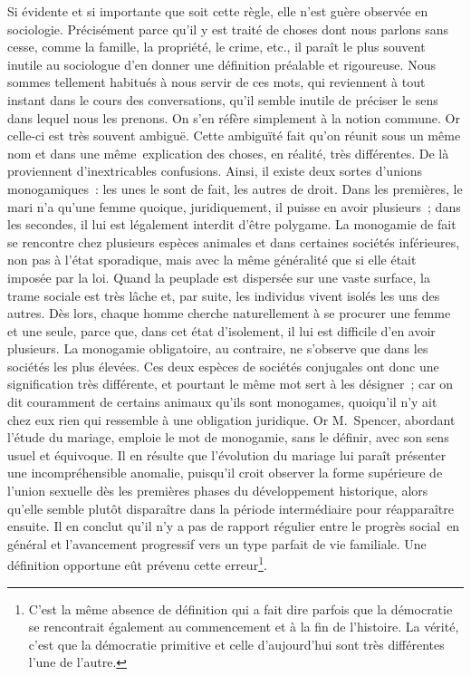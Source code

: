 \documentclass[french,twoside]{book} %
\begin{document}
Si évidente et si importante que soit cette règle, elle n’est guère observée en sociologie. Précisément parce qu’il y est traité de choses dont nous parlons sans cesse, comme la famille, la propriété, le crime, etc., il paraît le plus souvent inutile au sociologue d’en donner une définition préalable et rigoureuse. Nous sommes tellement habitués à nous servir de ces mots, qui reviennent à tout instant dans le cours des conversations, qu’il semble inutile de préciser le sens dans lequel nous les prenons. On s’en réfère simplement à la notion commune. Or celle-ci est très souvent ambiguë. Cette ambiguïté fait qu’on réunit sous un même nom et dans une même explication des choses, en réalité, très différentes. De là proviennent d’inextricables confusions. Ainsi, il existe deux sortes d’unions monogamiques : les unes le sont de fait, les autres de droit. Dans les premières, le mari n’a qu’une femme quoique, juridiquement, il puisse en avoir plusieurs ; dans les secondes, il lui est légalement interdit d’être polygame. La monogamie de fait se rencontre chez plusieurs espèces animales et dans certaines sociétés inférieures, non pas à l’état sporadique, mais avec la même généralité que si elle était imposée par la loi. Quand la peuplade est dispersée sur une vaste surface, la trame sociale est très lâche et, par suite, les individus vivent isolés les uns des autres. Dès lors, chaque homme cherche naturellement à se procurer une femme et une seule, parce que, dans cet état d’isolement, il lui est difficile d’en avoir plusieurs. La monogamie obligatoire, au contraire, ne s’observe que dans les sociétés les plus élevées. Ces deux espèces de sociétés conjugales ont donc une signification très différente, et pourtant le même mot sert à les désigner ; car on dit couramment de certains animaux qu’ils sont monogames, quoiqu’il n’y ait chez eux rien qui ressemble à une obligation juridique. Or M. Spencer, abordant l’étude du mariage, emploie le mot de monogamie, sans le définir, avec son sens usuel et équivoque. Il en résulte que l’évolution du mariage lui paraît présenter une incompréhensible anomalie, puisqu’il croit observer la forme supérieure de l’union sexuelle dès les premières phases du développement historique, alors qu’elle semble plutôt disparaître dans la période intermédiaire pour réapparaître ensuite. Il en conclut qu’il n’y a pas de rapport régulier entre le progrès social en général et l’avancement progressif vers un type parfait de vie familiale. Une définition opportune eût prévenu cette erreur\footnote{ C’est la même absence de définition qui a fait dire parfois que la démocratie se rencontrait également au commencement et à la fin de l’histoire. La vérité, c’est que la démocratie primitive et celle d’aujourd’hui sont très différentes l’une de l’autre.}.\par
\end{document}
